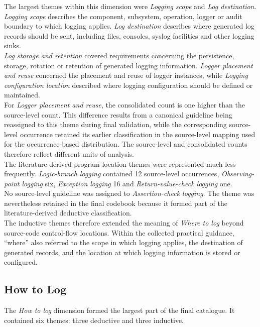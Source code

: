 The largest themes within this dimension were \textit{Logging scope} and
\textit{Log destination}. \textit{Logging scope} describes the component,
subsystem, operation, logger or audit boundary to which logging applies.
\textit{Log destination} describes where generated log records should be sent,
including files, consoles, syslog facilities and other logging sinks.
\\
\textit{Log storage and retention} covered requirements concerning the persistence,
storage, rotation or retention of generated logging information.
\textit{Logger placement and reuse} concerned the placement and reuse of logger
instances, while \textit{Logging configuration location} described where logging
configuration should be defined or maintained.
\\
For \textit{Logger placement and reuse}, the consolidated count is one higher
than the source-level count. This difference results from a canonical guideline
being reassigned to this theme during final validation, while the corresponding
source-level occurrence retained its earlier classification in the source-level
mapping used for the occurrence-based distribution. The source-level and
consolidated counts therefore reflect different units of analysis.
\\
The literature-derived program-location themes were represented much less
frequently. \textit{Logic-branch logging} contained 12 source-level occurrences,
\textit{Observing-point logging} six, \textit{Exception logging} 16 and
\textit{Return-value-check logging} one.
\\
No source-level guideline was assigned to \textit{Assertion-check logging}. The
theme was nevertheless retained in the final codebook because it formed part of
the literature-derived deductive classification.
\\
The inductive themes therefore extended the meaning of \textit{Where to log}
beyond source-code control-flow locations. Within the collected practical guidance,
``where'' also referred to the scope in which logging applies, the destination of
generated records, and the location at which logging information is stored or
configured.


\subsection{How to Log}

The \textit{How to log} dimension formed the largest part of the final catalogue.
It contained six themes: three deductive and three inductive.

